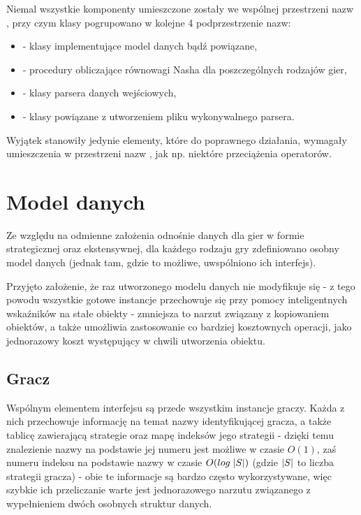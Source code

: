 \documentclass[polish]{standalone}
\begin{document}
Niemal wszystkie komponenty umieszczone zostały we wspólnej przestrzeni nazw , przy czym klasy pogrupowano
w kolejne 4 podprzestrzenie nazw:
\begin{itemize}
\item {} - klasy implementujące model danych bądź powiązane,
\item {} - procedury obliczające równowagi Nasha dla poszczególnych rodzajów gier,
\item {} - klasy parsera danych wejściowych,
\item {} - klasy powiązane z utworzeniem pliku wykonywalnego parsera.
\end{itemize}
Wyjątek stanowiły jedynie elementy, które do poprawnego działania, wymagały umieszczenia w przestrzeni nazw ,
jak np. niektóre przeciążenia operatorów.

\section{Model danych}

Ze względu na odmienne założenia odnośnie danych dla gier w formie strategicznej oraz ekstensywnej, dla każdego rodzaju
gry zdefiniowano osobny model danych (jednak tam, gdzie to możliwe, uwspólniono ich interfejs).

Przyjęto założenie, że raz utworzonego modelu danych nie modyfikuje się - z tego powodu wszystkie gotowe instancje
przechowuje się przy pomocy inteligentnych wskaźników na stałe obiekty - zmniejsza to narzut związany z kopiowaniem
obiektów, a także umożliwia zastosowanie co bardziej kosztownych operacji, jako jednorazowy koszt występujący
w chwili utworzenia obiektu.

\subsection{Gracz}

Wspólnym elementem interfejsu są przede wszystkim instancje graczy. Każda z nich przechowuje informację na temat nazwy
identyfikującej gracza, a także tablicę zawierającą strategie oraz mapę indeksów jego strategii - dzięki temu
znalezienie nazwy na podstawie jej numeru jest możliwe w czasie $O(1)$, zaś numeru indeksu na podstawie nazwy w czasie 
$O(log\;|S|)$ (gdzie $|S|$ to liczba strategii gracza) - obie te informacje są bardzo często wykorzystywane,
więc szybkie ich przeliczanie warte jest jednorazowego narzutu związanego z wypełnieniem dwóch osobnych struktur danych.
\end{document}
